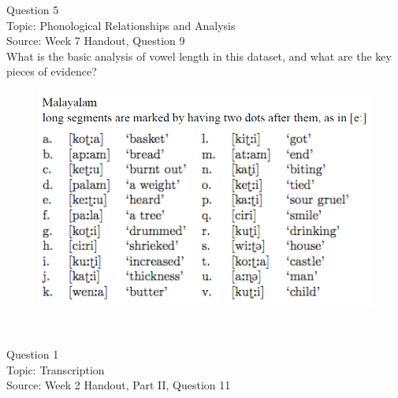 \documentclass[12pt]{article}
\begin{document}
\newpage

{\large Question 5}\\

Topic: Phonological Relationships and Analysis\\
Source: Week 7 Handout, Question 9\\

What is the basic analysis of vowel length in this dataset, and what are the key pieces of evidence?\\

\begin{figure}[H]
\includegraphics{../images/malayalam.png}
\end{figure}

\newpage

\begin{center}
\textbf{{\color{red}{\HUGE END OF EXAM}}}\\

\end{center}
\newpage

\begin{center}
\textbf{{\color{blue}{\HUGE START OF EXAM\\}}}

\textbf{{\color{blue}{\HUGE Student ID: 33428\\}}}

\textbf{{\color{blue}{\HUGE \\}}}

\end{center}
\newpage

{\large Question 1}\\

Topic: Transcription\\
Source: Week 2 Handout, Part II, Question 11\\
\end{document}
